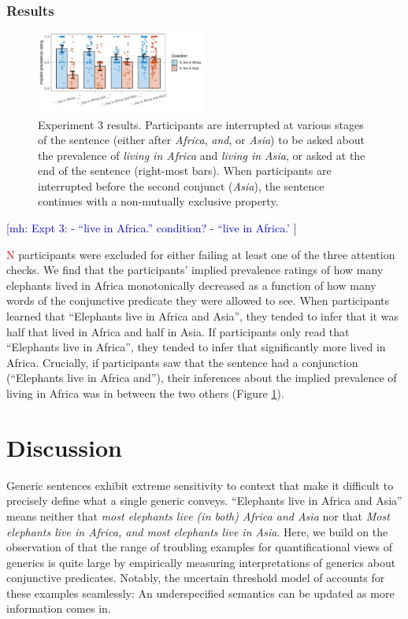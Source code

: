 \documentclass[10pt,letterpaper]{article}
\newcommand{\mh}[1]{{\textcolor{Blue}{[mh: #1]}}}
\newcommand{\red}[1]{{\textcolor{Red}{#1}}}
\begin{document}
 \subsubsection{Results}
\begin{figure}[h]
  \centering
    \includegraphics[width=0.5\textwidth]{expt3_summary}
  \caption{Experiment 3 results. Participants are interrupted at various stages of the sentence (either after \emph{Africa}, \emph{and}, or \emph{Asia}) to be asked about the prevalence of \emph{living in Africa} and \emph{living in Asia}, or asked at the end of the sentence (right-most bars). When participants are interrupted before the second conjunct (\emph{Asia}), the sentence continues with a non-mutually exclusive property.}
    \label{fig:expt3}
  \end{figure}
  
 \mh{Expt 3: 
 - ``live in Africa.'' condition?
 - ``live in Africa.'
 }
 

\red{N} participants were excluded for either failing at least one of the three attention checks.
We find that the participants' implied prevalence ratings of how many elephants lived in Africa monotonically decreased as a function of how many words of the conjunctive predicate they were allowed to see. 
When participants learned that ``Elephants live in Africa and Asia'', they tended to infer that it was half that lived in Africa and half in Asia.
If participants only read that ``Elephants live in Africa'', they tended to infer that significantly more lived in Africa. 
Crucially, if participants saw that the sentence had a conjunction (``Elephants live in Africa and''), their inferences about the implied prevalence of living in Africa was in between the two others (Figure \ref{fig:expt3}).




\section{Discussion}

Generic sentences exhibit extreme sensitivity to context that make it difficult to precisely define what a single generic conveys. 
``Elephants live in Africa and Asia'' means neither that \emph{most elephants live (in both) Africa and Asia} nor that \emph{Most elephants live in Africa, and most elephants live in Asia}.
Here, we build on the observation of  that the range of troubling examples for quantificational views of generics is quite large by empirically measuring interpretations of generics about conjunctive predicates.  
Notably, the uncertain threshold model of  accounts for these examples seamlessly: An underspecified semantics can be updated as more information comes in. 
\end{document}
